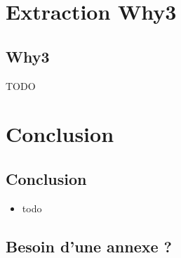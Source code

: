 \documentclass[11pt,usenames,dvipsnames]{beamer}
\begin{document}
\section{Extraction Why3}
\subsection{Why3}
\begin{frame}{\null}
  TODO
\end{frame}



\section{Conclusion}
\subsection{Conclusion}
\begin{frame}{\null}
  \begin{itemize}
  \item todo
  \end{itemize}
\end{frame}

\appendix
\subsection{Besoin d'une annexe ?}
\begin{frame}{\null}
\end{frame}
\end{document}

